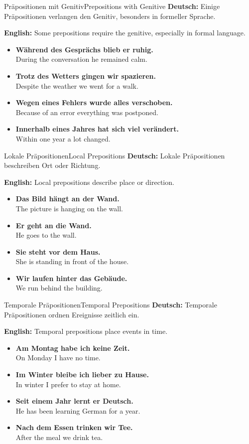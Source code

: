 \documentclass[a4paper,11pt]{article}
\newcommand{\GermanText}[1]{\textbf{Deutsch: }#1\par}
\newcommand{\EnglishText}[1]{{\color{SoftGray}\textbf{English: }#1\par}}
\newcommand{\ExampleItem}[2]{\item \textbf{#1}\\{\color{SoftGray}#2}}
\begin{document}
\begin{grammarentry}{Präpositionen mit Genitiv}{Prepositions with Genitive}
    \GermanText{Einige Präpositionen verlangen den Genitiv, besonders in formeller Sprache.}
    \EnglishText{Some prepositions require the genitive, especially in formal language.}
    \begin{exbox}
        \begin{itemize}
            \ExampleItem{Während des Gesprächs blieb er ruhig.}{During the conversation he remained calm.}
            \ExampleItem{Trotz des Wetters gingen wir spazieren.}{Despite the weather we went for a walk.}
            \ExampleItem{Wegen eines Fehlers wurde alles verschoben.}{Because of an error everything was postponed.}
            \ExampleItem{Innerhalb eines Jahres hat sich viel verändert.}{Within one year a lot changed.}
        \end{itemize}
    \end{exbox}
\end{grammarentry}

\begin{grammarentry}{Lokale Präpositionen}{Local Prepositions}
    \GermanText{Lokale Präpositionen beschreiben Ort oder Richtung.}
    \EnglishText{Local prepositions describe place or direction.}
    \begin{exbox}
        \begin{itemize}
            \ExampleItem{Das Bild hängt an der Wand.}{The picture is hanging on the wall.}
            \ExampleItem{Er geht an die Wand.}{He goes to the wall.}
            \ExampleItem{Sie steht vor dem Haus.}{She is standing in front of the house.}
            \ExampleItem{Wir laufen hinter das Gebäude.}{We run behind the building.}
        \end{itemize}
    \end{exbox}
\end{grammarentry}

\begin{grammarentry}{Temporale Präpositionen}{Temporal Prepositions}
    \GermanText{Temporale Präpositionen ordnen Ereignisse zeitlich ein.}
    \EnglishText{Temporal prepositions place events in time.}
    \begin{exbox}
        \begin{itemize}
            \ExampleItem{Am Montag habe ich keine Zeit.}{On Monday I have no time.}
            \ExampleItem{Im Winter bleibe ich lieber zu Hause.}{In winter I prefer to stay at home.}
            \ExampleItem{Seit einem Jahr lernt er Deutsch.}{He has been learning German for a year.}
            \ExampleItem{Nach dem Essen trinken wir Tee.}{After the meal we drink tea.}
        \end{itemize}
    \end{exbox}
\end{grammarentry}
\end{document}

